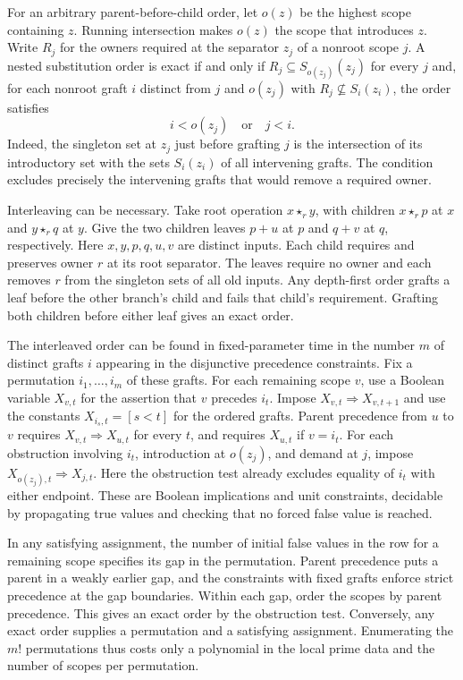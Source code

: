 For an arbitrary parent-before-child order, let $o(z)$ be the highest
scope containing $z$. Running intersection makes $o(z)$ the scope that
introduces $z$. Write $R_j$ for the owners required at the separator $z_j$
of a nonroot scope $j$. A nested substitution order is exact if and only
if $R_j\subseteq S_{o(z_j)}(z_j)$ for every $j$ and, for each nonroot
graft $i$ distinct from $j$ and $o(z_j)$ with
$R_j\not\subseteq S_i(z_i)$, the order satisfies
\[
  i<o(z_j)\quad\text{or}\quad j<i.
\]
Indeed, the singleton set at $z_j$ just before grafting $j$ is the
intersection of its introductory set with the sets $S_i(z_i)$ of all
intervening grafts. The condition excludes precisely the intervening
grafts that would remove a required owner.

Interleaving can be necessary. Take root operation $x\star_r y$, with
children $x\star_r p$ at $x$ and $y\star_r q$ at $y$. Give the two
children leaves $p+u$ at $p$ and $q+v$ at $q$, respectively. Here
$x,y,p,q,u,v$ are distinct inputs. Each child requires and preserves
owner $r$ at its root separator. The leaves require no owner and each
removes $r$ from the singleton sets of all old inputs. Any depth-first
order grafts a leaf before the other branch's child and fails that
child's requirement. Grafting both children before either leaf gives
an exact order.

The interleaved order can be found in fixed-parameter time in the
number $m$ of distinct grafts $i$ appearing in the disjunctive
precedence constraints. Fix a permutation $i_1,\ldots,i_m$ of these grafts. For each
remaining scope $v$, use a Boolean variable $X_{v,t}$ for the assertion
that $v$ precedes $i_t$. Impose $X_{v,t}\Rightarrow X_{v,t+1}$ and use
the constants $X_{i_s,t}=[s<t]$ for the ordered grafts. Parent precedence
from $u$ to $v$ requires $X_{v,t}\Rightarrow X_{u,t}$ for every $t$,
and requires $X_{u,t}$ if $v=i_t$. For each obstruction involving
$i_t$, introduction at $o(z_j)$, and demand at $j$, impose
$X_{o(z_j),t}\Rightarrow X_{j,t}$. Here the obstruction test already
excludes equality of $i_t$ with either endpoint. These are Boolean
implications and unit constraints, decidable by propagating true
values and checking that no forced false value is reached.

In any satisfying assignment, the number of initial false values in
the row for a remaining scope specifies its gap in the permutation.
Parent precedence puts a parent in a weakly earlier gap, and the
constraints with fixed grafts enforce strict precedence at the gap
boundaries. Within each gap, order the scopes by parent precedence.
This gives an exact order by the obstruction test. Conversely, any
exact order supplies a permutation and a satisfying assignment.
Enumerating the $m!$ permutations thus costs only a polynomial in the
local prime data and the number of scopes per permutation.

